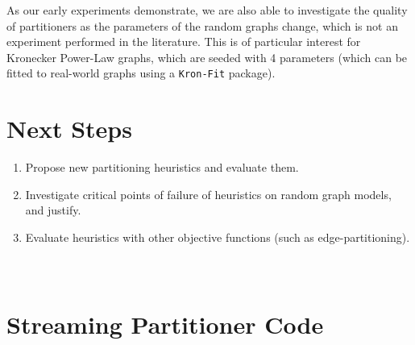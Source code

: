\documentclass[11pt]{article}
\begin{document}
As our early experiments demonstrate, we are also able to investigate the quality of partitioners as the parameters of the random graphs change, which is not an experiment performed in the literature. This is of particular interest for Kronecker Power-Law graphs, which are seeded with 4 parameters (which can be fitted to real-world graphs using a \texttt{Kron-Fit}  package).

\section{Next Steps}
\begin{enumerate}
\item Propose new partitioning heuristics and evaluate them.
\item Investigate critical points of failure of heuristics on random graph models, and justify.
\item Evaluate heuristics with other objective functions (such as edge-partitioning).
\end{enumerate}





\newpage
\appendix
\section{\\Streaming Partitioner Code} \label{App:AppendixA}
\end{document}
